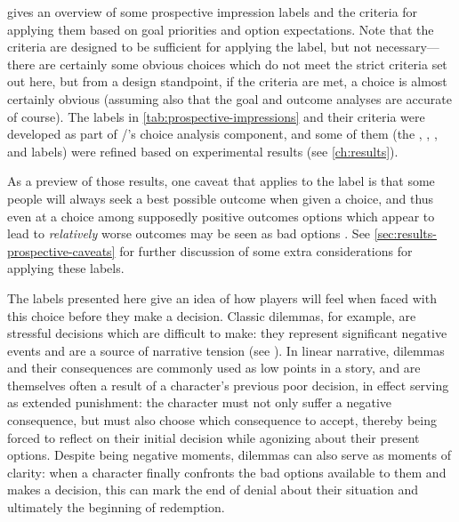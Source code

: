  gives an overview of some prospective impression labels and the criteria for applying them based on goal priorities and option expectations.
%
Note that the criteria are designed to be sufficient for applying the label, but not necessary---there are certainly some obvious choices which do not meet the strict criteria set out here, but from a design standpoint, if the criteria are met, a choice is almost certainly obvious (assuming also that the goal and outcome analyses are accurate of course).
%
The labels in \cref{tab:prospective-impressions} and their criteria were developed as part of \dunyazad/'s choice analysis component, and some of them (the , , , and  labels) were refined based on experimental results (see \cref{ch:results}).


As a preview of those results, one caveat that applies to the  label is that some people will always seek a best possible outcome when given a choice, and thus even at a choice among supposedly positive outcomes options which appear to lead to \emph{relatively} worse outcomes may be seen as bad options \citep{Schwartz2002}.
%
See \cref{sec:results-prospective-caveats} for further discussion of some extra considerations for applying these labels.


The labels presented here give an idea of how players will feel when faced with this choice before they make a decision.
%
Classic dilemmas, for example, are stressful decisions which are difficult to make: they represent significant negative events and are a source of narrative tension (see \citep{Barber2007a}).
%
In linear narrative, dilemmas and their consequences are commonly used as low points in a story, and are themselves often a result of a character's previous poor decision, in effect serving as extended punishment: the character must not only suffer a negative consequence, but must also choose which consequence to accept, thereby being forced to reflect on their initial decision while agonizing about their present options.
%
Despite being negative moments, dilemmas can also serve as moments of clarity: when a character finally confronts the bad options available to them and makes a decision, this can mark the end of denial about their situation and ultimately the beginning of redemption.


